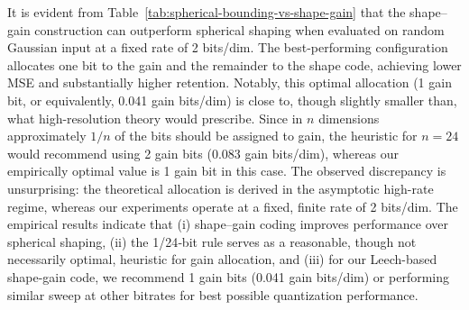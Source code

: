 \documentclass{article}
\theoremstyle{plain}
\theoremstyle{definition}
\theoremstyle{remark}
\begin{document}
\begin{table}[h]
    \centering
{}
    \caption{Comparison between spherical shaping and shape--gain quantization at a fixed budget of 2 bits/dim. For shape--gain we vary the allocation between directional (shape) bits and radial (gain) bits while keeping the total rate fixed.}
    \label{tab:spherical-bounding-vs-shape-gain}
\end{table}

It is evident from Table~\ref{tab:spherical-bounding-vs-shape-gain} that the shape--gain construction can outperform spherical shaping when evaluated on random Gaussian input at a fixed rate of 2 bits/dim. The best-performing configuration allocates one bit to the gain and the remainder to the shape code, achieving lower MSE and substantially higher retention. Notably, this optimal allocation (1 gain bit, or equivalently, 0.041 gain bits/dim) is close to, though slightly smaller than, what high-resolution theory would prescribe. Since in \(n\) dimensions approximately \(1/n\) of the bits should be assigned to gain, the heuristic for \(n=24\) would recommend using 2 gain bits (0.083 gain bits/dim), whereas our empirically optimal value is 1 gain bit in this case. The observed discrepancy is unsurprising: the theoretical allocation is derived in the asymptotic high-rate regime, whereas our experiments operate at a fixed, finite rate of 2 bits/dim. The empirical results indicate that (i) shape–gain coding improves performance over spherical shaping, (ii) the 1/24‑bit rule serves as a reasonable, though not necessarily optimal, heuristic for gain allocation, and (iii) for our Leech-based shape-gain code, we recommend 1 gain bits (0.041 gain bits/dim) or performing similar sweep at other bitrates for best possible quantization performance.
\end{document}
